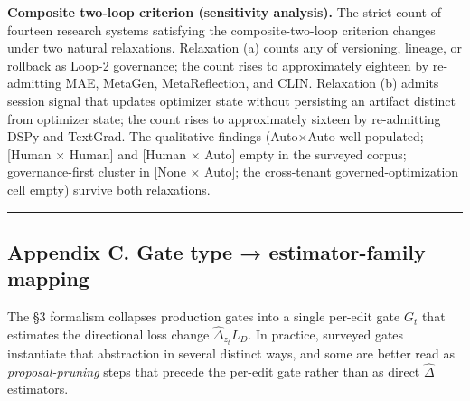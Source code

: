 \documentclass[
]{article}
\begin{document}
\textbf{Composite two-loop criterion (sensitivity analysis).} The strict
count of fourteen research systems satisfying the composite-two-loop
criterion changes under two natural relaxations. Relaxation (a) counts
any of versioning, lineage, or rollback as Loop-2 governance; the count
rises to approximately eighteen by re-admitting MAE, MetaGen,
MetaReflection, and CLIN. Relaxation (b) admits session signal that
updates optimizer state without persisting an artifact distinct from
optimizer state; the count rises to approximately sixteen by
re-admitting DSPy and TextGrad. The qualitative findings (Auto×Auto
well-populated; {[}Human × Human{]} and {[}Human × Auto{]} empty in the
surveyed corpus; governance-first cluster in {[}None × Auto{]}; the
cross-tenant governed-optimization cell empty) survive both relaxations.

\begin{center}\rule{0.5\linewidth}{0.5pt}\end{center}

\subsection{Appendix C. Gate type → estimator-family
mapping}\label{appendix-c.-gate-type-estimator-family-mapping}

The §3 formalism collapses production gates into a single per-edit gate
\(G_t\) that estimates the directional loss change
\(\widehat{\Delta}_{z_t} L_D\). In practice, surveyed gates instantiate
that abstraction in several distinct ways, and some are better read as
\emph{proposal-pruning} steps that precede the per-edit gate rather than
as direct \(\widehat{\Delta}\) estimators.
\end{document}
